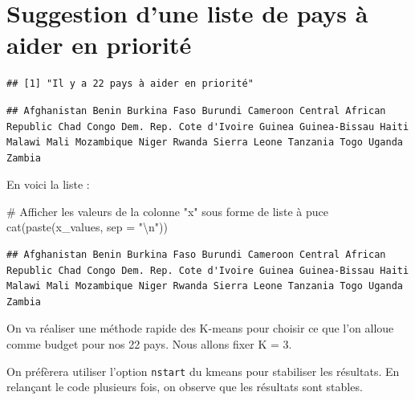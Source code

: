 \documentclass[
]{article}
\newenvironment{Shaded}{}{}
\newcommand{\AttributeTok}[1]{#1}
\newcommand{\CommentTok}[1]{\textcolor[rgb]{0.00,0.50,0.00}{#1}}
\newcommand{\DecValTok}[1]{#1}
\newcommand{\FunctionTok}[1]{#1}
\newcommand{\NormalTok}[1]{#1}
\newcommand{\OtherTok}[1]{\textcolor[rgb]{1.00,0.25,0.00}{#1}}
\newcommand{\SpecialCharTok}[1]{\textcolor[rgb]{0.00,0.50,0.50}{#1}}
\newcommand{\StringTok}[1]{\textcolor[rgb]{0.00,0.50,0.50}{#1}}
\begin{document}
\hypertarget{suggestion-dune-liste-de-pays-uxe0-aider-en-priorituxe9}{%
\section{Suggestion d'une liste de pays à aider en
priorité}\label{suggestion-dune-liste-de-pays-uxe0-aider-en-priorituxe9}}

\begin{verbatim}
## [1] "Il y a 22 pays à aider en priorité"
\end{verbatim}

\begin{verbatim}
## Afghanistan Benin Burkina Faso Burundi Cameroon Central African Republic Chad Congo Dem. Rep. Cote d'Ivoire Guinea Guinea-Bissau Haiti Malawi Mali Mozambique Niger Rwanda Sierra Leone Tanzania Togo Uganda Zambia
\end{verbatim}

En voici la liste :

\begin{Shaded}
\begin{Highlighting}[]
\CommentTok{\# Afficher les valeurs de la colonne "x" sous forme de liste à puce}
\FunctionTok{cat}\NormalTok{(}\FunctionTok{paste}\NormalTok{(x\_values, }\AttributeTok{sep =} \StringTok{"}\SpecialCharTok{\textbackslash{}n}\StringTok{"}\NormalTok{))}
\end{Highlighting}
\end{Shaded}

\begin{verbatim}
## Afghanistan Benin Burkina Faso Burundi Cameroon Central African Republic Chad Congo Dem. Rep. Cote d'Ivoire Guinea Guinea-Bissau Haiti Malawi Mali Mozambique Niger Rwanda Sierra Leone Tanzania Togo Uganda Zambia
\end{verbatim}

On va réaliser une méthode rapide des K-means pour choisir ce que l'on
alloue comme budget pour nos 22 pays. Nous allons fixer K = 3.

On préfèrera utiliser l'option \texttt{nstart} du kmeans pour stabiliser
les résultats. En relançant le code plusieurs fois, on observe que les
résultats sont stables.

\begin{Shaded}
\end{Shaded}
\end{document}

